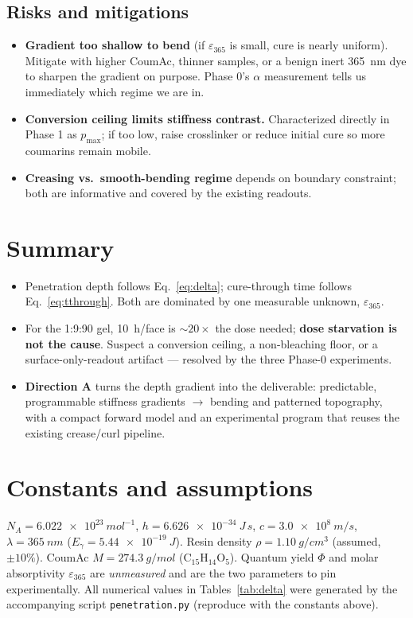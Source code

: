 \documentclass[11pt]{article}
\newcommand{\eps}{\varepsilon_{365}}
\begin{document}
\subsection{Risks and mitigations}
\begin{itemize}[leftmargin=*]
  \item \textbf{Gradient too shallow to bend} (if $\eps$ is small, cure is nearly uniform).
  Mitigate with higher CoumAc, thinner samples, or a benign inert \SI{365}{nm} dye to sharpen
  the gradient on purpose. Phase 0's $\alpha$ measurement tells us immediately which regime
  we are in.
  \item \textbf{Conversion ceiling limits stiffness contrast.} Characterized directly in
  Phase 1 as $p_\text{max}$; if too low, raise crosslinker or reduce initial cure so more
  coumarins remain mobile.
  \item \textbf{Creasing vs.\ smooth-bending regime} depends on boundary constraint; both are
  informative and covered by the existing readouts.
\end{itemize}

\section{Summary}
\begin{itemize}[leftmargin=*]
  \item Penetration depth follows Eq.~\eqref{eq:delta}; cure-through time follows
  Eq.~\eqref{eq:tthrough}. Both are dominated by one measurable unknown, $\eps$.
  \item For the 1:9:90 gel, \SI{10}{h}/face is $\sim\!20\times$ the dose needed; \textbf{dose
  starvation is not the cause}. Suspect a conversion ceiling, a non-bleaching floor, or a
  surface-only-readout artifact --- resolved by the three Phase-0 experiments.
  \item \textbf{Direction A} turns the depth gradient into the deliverable: predictable,
  programmable stiffness gradients $\to$ bending and patterned topography, with a compact
  forward model and an experimental program that reuses the existing crease/curl pipeline.
\end{itemize}

\appendix
\section{Constants and assumptions}
$N_A=\SI{6.022e23}{mol^{-1}}$, $h=\SI{6.626e-34}{J\,s}$, $c=\SI{3.0e8}{m/s}$,
$\lambda=\SI{365}{nm}$ ($E_\gamma=\SI{5.44e-19}{J}$). Resin density
$\rho=\SI{1.10}{g/cm^3}$ (assumed, $\pm10\%$). CoumAc $M=\SI{274.3}{g/mol}$
($\mathrm{C_{15}H_{14}O_5}$). Quantum yield $\Phi$ and molar absorptivity $\eps$ are
\emph{unmeasured} and are the two parameters to pin experimentally. All numerical values in
Tables~\ref{tab:delta} were generated by the accompanying script
\texttt{penetration.py} (reproduce with the constants above).
\end{document}
